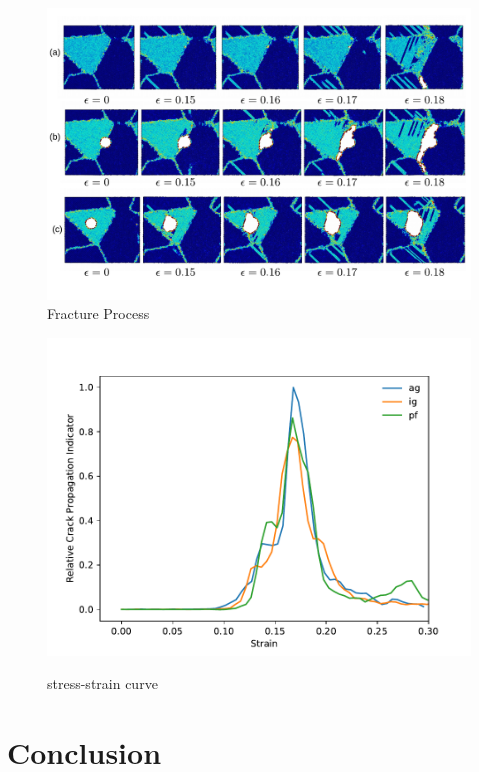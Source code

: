 \documentclass[times]{elsarticle}
\begin{document}
\begin{figure}[h]
	\centering
	\includegraphics[width=1\linewidth]{"img/fracture3"}
	\caption{Fracture Process}
	\label{fig:fracture-process}
\end{figure}




% 


\begin{figure}[h]
	\centering
	\includegraphics[width=0.7\linewidth]{img/1stdiv}
	\label{fig:surf}
	\caption{stress-strain curve}
\end{figure}


\section{Conclusion}
%


\end{document}
